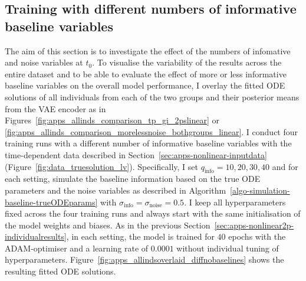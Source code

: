 \subsection{Training with different numbers of informative baseline variables}\label{sec:apps-nonlinear2p-diffbaselinenumbers}
The aim of this section is to investigate the effect of the numbers of infomative and noise variables at $t_0$. To visualise the variability of the results across the entire dataset and to be able to evaluate the effect of more or less informative baseline variables on the overall model performance, I overlay the fitted ODE solutions of all individuals from each of the two groups and their posterior means from the VAE encoder as in Figures~\ref{fig:apps_allinds_comparison_tp_gi_2pslinear} or \ref{fig:apps_allinds_comparison_morelessnoise_bothgroups_linear}. I conduct four training runs with a different number of informative baseline variables with the time-dependent data described in Section~\ref{sec:apps-nonlinear-inputdata} (Figure~\ref{fig:data_truesolution_lv}). Specifically, I set $q_{\mathrm{info}} = 10, 20, 30, 40$ and for each setting, simulate the baseline information based on the true ODE parameters and the noise variables as described in Algorithm~\ref{algo-simulation-baseline-trueODEparams} with $\sigma_{\mathrm{info}} = \sigma_{\mathrm{noise}} = 0.5$. 
I keep all hyperparameters fixed across the four training runs and always start with the same initialisation of the model weights and biases. As in the previous Section~\ref{sec:apps-nonlinear2p-individualresults}, in each setting, the model is trained for $40$ epochs with the ADAM-optimiser and a learning rate of $0.0001$ without individual tuning of hyperparameters.  
Figure~\ref{fig:apps_allindsoverlaid_diffnobaselines} shows the resulting fitted ODE solutions. 
